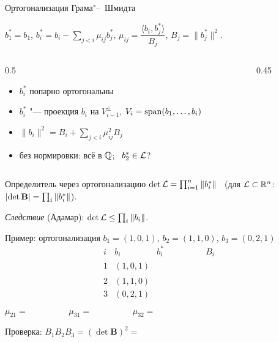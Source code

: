 \documentclass{ca-slides}
\begin{document}
\begin{canvasframe}{Ортогонализация Грама"--~Шмидта}
  \begin{definition}
    $b_1^* = b_1$, \quad $b_i^* = b_i - \sum_{j<i} \mu_{ij} b_j^*$, \quad
    $\mu_{ij} = \dfrac{\langle b_i, b_j^*\rangle}{B_j}$, \quad $B_j = \|b_j^*\|^2$.
  \end{definition}
  \begin{columns}[T]
    \begin{column}{0.5\linewidth}
      \begin{itemize}
        \item $b_i^*$ попарно ортогональны
        \item $b_i^*$ "--- проекция $b_i$ на $V_{i-1}^\perp$, $V_i = \operatorname{span}(b_1, \dots, b_i)$
        \item $\|b_i\|^2 = B_i + \sum_{j<i} \mu_{ij}^2 B_j$
        \item без нормировки: всё в $\mathbb{Q}$; \ \textcolor{caRed}{$b_2^* \in \mathcal{L}$?}
      \end{itemize}
    \end{column}
    \begin{column}{0.45\linewidth}
      \centering
    \end{column}
  \end{columns}
\end{canvasframe}

\begin{theoremframe}{Определитель через ортогонализацию}
  $\det \mathcal{L} = \prod_{i=1}^n \|b_i^*\|$ \ (для $\mathcal{L} \subset \mathbb{R}^n$: \
  $\lvert\det \mathbf B\rvert = \prod_i \|b_i^*\|$).
  \par\smallskip
  \emph{Следствие} (Адамар): $\det \mathcal{L} \le \prod_i \|b_i\|$.
\end{theoremframe}

\begin{canvasframe}{Пример: ортогонализация}
  $b_1 = (1, 0, 1)$, \quad $b_2 = (1, 1, 0)$, \quad $b_3 = (0, 2, 1)$
  \[
    \begin{array}{c|c|c|c}
      i & b_i & b_i^* & B_i \\ \hline
      1 & (1, 0, 1) & \phantom{(\tfrac12, 1, -\tfrac12)} & \phantom{\tfrac32} \\[6pt]
      2 & (1, 1, 0) & & \\[6pt]
      3 & (0, 2, 1) & & \\[6pt]
    \end{array}
  \]
  $\mu_{21} = \hspace{2cm} \mu_{31} = \hspace{2cm} \mu_{32} =$
  \par\medskip
  Проверка: $B_1 B_2 B_3 = (\det \mathbf B)^2 =$
  \notearea[0.08\textheight]
\end{canvasframe}
\end{document}
